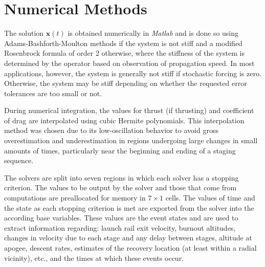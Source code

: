 \documentclass[11pt]{thesis}
\numberwithin{equation}{section}
\begin{document}
\section{Numerical Methods} \label{Numerical Methods}
The solution $\mathbf{x}(t)$ is obtained numerically in \textsl{Matlab} and is done so using Adams-Bashforth-Moulton methods if the system is not stiff and a modified Rosenbrock formula of order 2 otherwise, where the stiffness of the system is determined by the operator based on observation of propagation speed. In most applications, however, the system is generally not stiff if stochastic forcing is zero. Otherwise, the system may be stiff depending on whether the requested error tolerances are too small or not.

During numerical integration, the values for thrust (if thrusting) and coefficient of drag are interpolated using cubic Hermite polynomials. This interpolation method was chosen due to its low-oscillation behavior to avoid gross overestimation and underestimation in regions undergoing large changes in small amounts of times, particularly near the beginning and ending of a staging sequence.

The solvers are split into seven regions in which each solver has a stopping criterion. The values to be output by the solver and those that come from computations are preallocated for memory in $7 \times 1$ cells. The values of time and the state as each stopping criterion is met are exported from the solver into the according base variables. These values are the event states and are used to extract information regarding: launch rail exit velocity, burnout altitudes, changes in velocity due to each stage and any delay between stages, altitude at apogee, descent rates, estimates of the recovery location (at least within a radial vicinity), etc., and the times at which these events occur.
\end{document}
